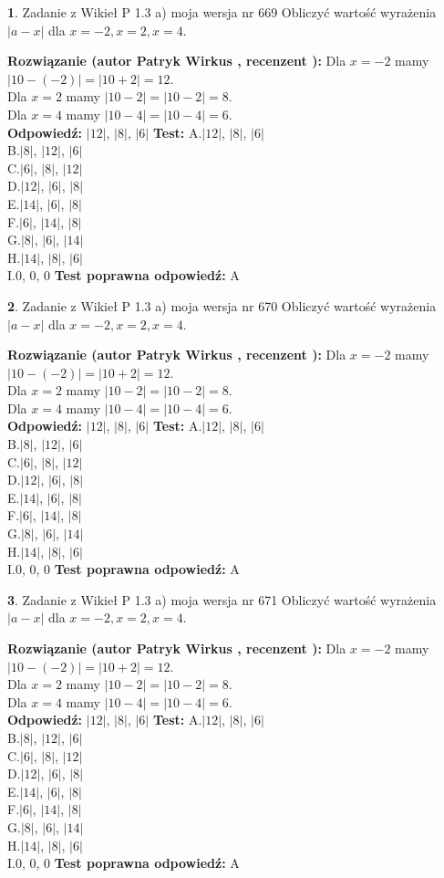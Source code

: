 \documentclass[12pt, a4paper]{article}
\theoremstyle{definition} %
\newtheorem{zad}{}
\newcommand{\zadStart}[1]{\begin{zad}#1\newline}
\newcommand{\zadStop}{\end{zad}}
\newcommand{\rozwStart}[2]{\noindent \textbf{Rozwiązanie (autor #1 , recenzent #2): }\newline}
\newcommand{\rozwStop}{\newline}
\newcommand{\odpStart}{\noindent \textbf{Odpowiedź:}\newline}
\newcommand{\odpStop}{\newline}
\newcommand{\testStart}{\noindent \textbf{Test:}\newline}
\newcommand{\testStop}{\newline}
\newcommand{\kluczStart}{\noindent \textbf{Test poprawna odpowiedź:}\newline}
\newcommand{\kluczStop}{\newline}
\begin{document}
\zadStart{Zadanie z Wikieł P 1.3 a) moja wersja nr 669}
Obliczyć wartość wyrażenia $|a - x|$ dla $x=-2,x=2,x=4$.
\zadStop
\rozwStart{Patryk Wirkus}{}
Dla $x = -2$ mamy $|10 - (-2)| = |10 + 2| = 12$.\\
Dla $x = 2$ mamy $|10 - 2| = |10 - 2| = 8$.\\
Dla $x = 4$ mamy $|10 - 4| = |10 - 4| = 6$.\\
\rozwStop
\odpStart
$|12|$, $|8|$, $|6|$
\odpStop
\testStart
A.$|12|$, $|8|$, $|6|$\\
B.$|8|$, $|12|$, $|6|$\\
C.$|6|$, $|8|$, $|12|$\\
D.$|12|$, $|6|$, $|8|$\\
E.$|14|$, $|6|$, $|8|$\\
F.$|6|$, $|14|$, $|8|$\\
G.$|8|$, $|6|$, $|14|$\\
H.$|14|$, $|8|$, $|6|$\\
I.$0$, $0$, $0$
\testStop
\kluczStart
A
\kluczStop



\zadStart{Zadanie z Wikieł P 1.3 a) moja wersja nr 670}
Obliczyć wartość wyrażenia $|a - x|$ dla $x=-2,x=2,x=4$.
\zadStop
\rozwStart{Patryk Wirkus}{}
Dla $x = -2$ mamy $|10 - (-2)| = |10 + 2| = 12$.\\
Dla $x = 2$ mamy $|10 - 2| = |10 - 2| = 8$.\\
Dla $x = 4$ mamy $|10 - 4| = |10 - 4| = 6$.\\
\rozwStop
\odpStart
$|12|$, $|8|$, $|6|$
\odpStop
\testStart
A.$|12|$, $|8|$, $|6|$\\
B.$|8|$, $|12|$, $|6|$\\
C.$|6|$, $|8|$, $|12|$\\
D.$|12|$, $|6|$, $|8|$\\
E.$|14|$, $|6|$, $|8|$\\
F.$|6|$, $|14|$, $|8|$\\
G.$|8|$, $|6|$, $|14|$\\
H.$|14|$, $|8|$, $|6|$\\
I.$0$, $0$, $0$
\testStop
\kluczStart
A
\kluczStop



\zadStart{Zadanie z Wikieł P 1.3 a) moja wersja nr 671}
Obliczyć wartość wyrażenia $|a - x|$ dla $x=-2,x=2,x=4$.
\zadStop
\rozwStart{Patryk Wirkus}{}
Dla $x = -2$ mamy $|10 - (-2)| = |10 + 2| = 12$.\\
Dla $x = 2$ mamy $|10 - 2| = |10 - 2| = 8$.\\
Dla $x = 4$ mamy $|10 - 4| = |10 - 4| = 6$.\\
\rozwStop
\odpStart
$|12|$, $|8|$, $|6|$
\odpStop
\testStart
A.$|12|$, $|8|$, $|6|$\\
B.$|8|$, $|12|$, $|6|$\\
C.$|6|$, $|8|$, $|12|$\\
D.$|12|$, $|6|$, $|8|$\\
E.$|14|$, $|6|$, $|8|$\\
F.$|6|$, $|14|$, $|8|$\\
G.$|8|$, $|6|$, $|14|$\\
H.$|14|$, $|8|$, $|6|$\\
I.$0$, $0$, $0$
\testStop
\kluczStart
A
\kluczStop
\end{document}

